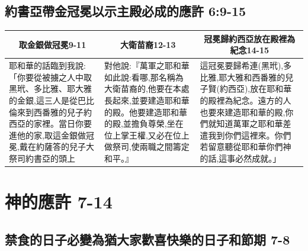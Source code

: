 \subsection{約書亞帶金冠冕以示主殿必成的應許 6:9-15}
\begin{table}[H]
\centering
\begin{tabular}{p{5.45cm}|p{5.35cm}|p{6.2cm}}\hline\hline
\multicolumn{1}{c|}{取金銀做冠冕9-11}&\multicolumn{1}{c|}{大衛苗裔12-13}&\multicolumn{1}{c}{冠冕歸約西亞放在殿裡為紀念14-15}\\\hline
耶和華的話臨到我說:「你要從被擄之人中取黑玳、多比雅、耶大雅的金銀,這三人是從巴比倫來到西番雅的兒子約西亞的家裡。當日你要進他的家,取這金銀做冠冕,戴在約薩答的兒子大祭司約書亞的頭上
&對他說:『萬軍之耶和華如此說:看哪,那名稱為大衛苗裔的,他要在本處長起來,並要建造耶和華的殿。他要建造耶和華的殿,並擔負尊榮,坐在位上掌王權,又必在位上做祭司,使兩職之間籌定和平。』
&這冠冕要歸希連(黑玳),多比雅,耶大雅和西番雅的兒子賢(約西亞),放在耶和華的殿裡為紀念。遠方的人也要來建造耶和華的殿,你們就知道萬軍之耶和華差遣我到你們這裡來。你們若留意聽從耶和華你們神的話,這事必然成就。」\\\hline
\end{tabular}
\end{table}



\section{神的應許 7-14}
\subsection{禁食的日子必變為猶大家歡喜快樂的日子和節期 7-8}

